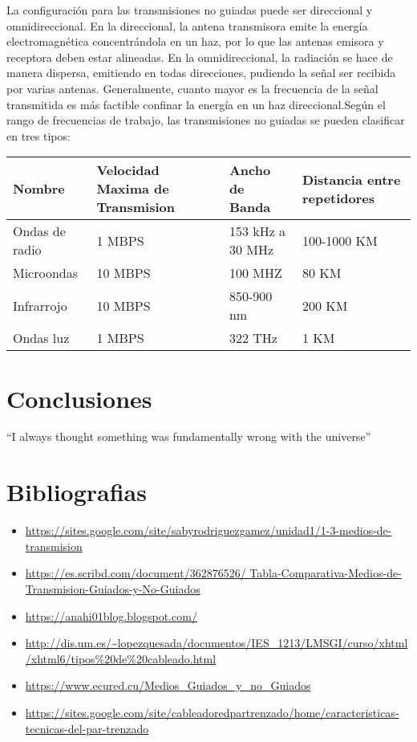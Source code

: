 \documentclass[12pt]{article}
\begin{document}
La configuración para las transmisiones no guiadas puede ser direccional y omnidireccional. En la direccional, la antena transmisora emite la energía electromagnética concentrándola en un haz, por lo que las antenas emisora y receptora deben estar alineadas. En la omnidireccional, la radiación se hace de manera dispersa, emitiendo en todas direcciones, pudiendo la señal ser recibida por varias antenas. Generalmente, cuanto mayor es la frecuencia de la señal transmitida es más factible confinar la energía en un haz direccional.Según el rango de frecuencias de trabajo, las transmisiones no guiadas se pueden clasificar en tres tipos:

\begin{center}
 \begin{tabular}{||p{3 cm} p{3 cm} p{3cm} p{3cm}||} 
 \hline
 \centering
 Nombre & Velocidad Maxima de Transmision & Ancho de Banda & Distancia entre repetidores\\ [0.5ex] 
 \hline\hline
 Ondas de radio & 1 MBPS & 153 kHz a 30 MHz & 100-1000 KM\\ 
 \hline
 Microondas & 10 MBPS & 100 MHZ & 80 KM\\
 \hline
 Infrarrojo & 10 MBPS & 850-900 nm & 200 KM\\
 \hline
 Ondas luz & 1 MBPS & 322 THz & 1 KM\\
 \hline

\end{tabular}
\end{center}


\section{Conclusiones}

``I always thought something was fundamentally wrong with the universe'' \cite{adams1995hitchhiker}

\section{Bibliografias}
\begin{itemize}
\item {\url{https://sites.google.com/site/sabyrodriguezgamez/unidad1/1-3-medios-de-transmision}}
\item{\url{https://es.scribd.com/document/362876526/ Tabla-Comparativa-Medios-de-Transmision-Guiados-y-No-Guiados}}
\item {\url{https://anahi01blog.blogspot.com/}}
\item{\url{http://dis.um.es/~lopezquesada/documentos/IES_1213/LMSGI/curso/xhtml/xhtml6/tipos%20de%20cableado.html}}
\item {\url{https://www.ecured.cu/Medios_Guiados_y_no_Guiados}}
\item{\url{ https://sites.google.com/site/cableadoredpartrenzado/home/caracteristicas-tecnicas-del-par-trenzado}}
\end{itemize}
\end{document}
